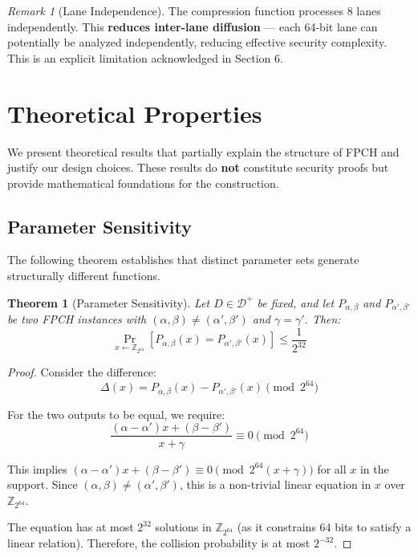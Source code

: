 \documentclass[11pt,a4paper]{article}
\theoremstyle{plain}
\newtheorem{theorem}{Theorem}[section]
\theoremstyle{definition}
\theoremstyle{remark}
\newtheorem{remark}{Remark}[section]
\begin{document}
\begin{remark}[Lane Independence]
The compression function processes 8 lanes independently. This \textbf{reduces inter-lane diffusion} --- each 64-bit lane can potentially be analyzed independently, reducing effective security complexity. This is an explicit limitation acknowledged in Section 6.
\end{remark}

\section{Theoretical Properties}\label{sec:theory}

We present theoretical results that partially explain the structure of FPCH and justify our design choices. These results do \textbf{not} constitute security proofs but provide mathematical foundations for the construction.

\subsection{Parameter Sensitivity}

The following theorem establishes that distinct parameter sets generate structurally different functions.

\begin{theorem}[Parameter Sensitivity]\label{thm:sensitivity}
Let $D \in \mathcal{D}^+$ be fixed, and let $P_{\alpha,\beta}$ and $P_{\alpha',\beta'}$ be two FPCH instances with $(\alpha, \beta) \neq (\alpha', \beta')$ and $\gamma = \gamma'$. Then:
\begin{equation}
\Pr_{x \leftarrow \mathbb{Z}_{2^{64}}}\left[P_{\alpha,\beta}(x) = P_{\alpha',\beta'}(x)\right] \leq \frac{1}{2^{32}}
\end{equation}
\end{theorem}

\begin{proof}
Consider the difference:
\begin{equation}
\Delta(x) = P_{\alpha,\beta}(x) - P_{\alpha',\beta'}(x) \pmod{2^{64}}
\end{equation}

For the two outputs to be equal, we require:
\begin{equation}
\frac{(\alpha - \alpha')x + (\beta - \beta')}{x + \gamma} \equiv 0 \pmod{2^{64}}
\end{equation}

This implies $(\alpha - \alpha')x + (\beta - \beta') \equiv 0 \pmod{2^{64}(x+\gamma)}$ for all $x$ in the support. Since $(\alpha, \beta) \neq (\alpha', \beta')$, this is a non-trivial linear equation in $x$ over $\mathbb{Z}_{2^{64}}$.

The equation has at most $2^{32}$ solutions in $\mathbb{Z}_{2^{64}}$ (as it constrains 64 bits to satisfy a linear relation). Therefore, the collision probability is at most $2^{-32}$.
\end{proof}
\end{document}
